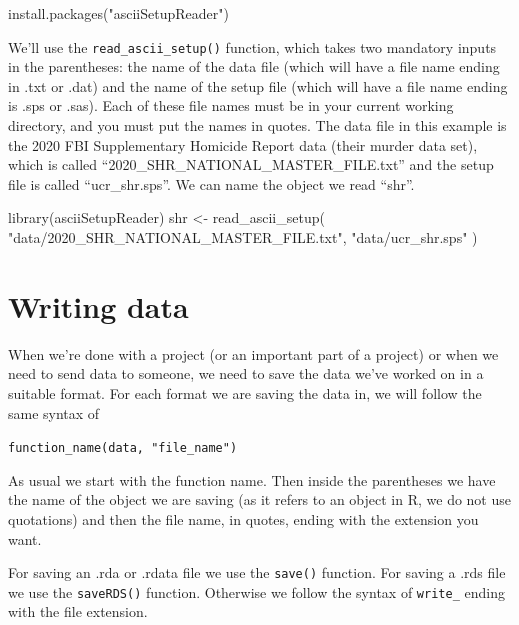 \documentclass[
]{krantz}
\makeatletter
\newenvironment{Shaded}{\begin{snugshade}}{\end{snugshade}}
\newcommand{\FunctionTok}[1]{\textcolor[rgb]{0,0,0}{#1}}
\newcommand{\NormalTok}[1]{#1}
\newcommand{\OtherTok}[1]{\textcolor[rgb]{0.37,0.37,0.37}{#1}}
\newcommand{\StringTok}[1]{\textcolor[rgb]{0.5,0.5,0.5}{#1}}
\newenvironment{kframe}{%
\medskip{}
\setlength{\fboxsep}{.8em}
 \def\at@end@of@kframe{}%
 \ifinner\ifhmode%
  \def\at@end@of@kframe{\end{minipage}}%
  \begin{minipage}{\columnwidth}%
 \fi\fi%
 \def\FrameCommand##1{\hskip\@totalleftmargin \hskip-\fboxsep
 \colorbox{shadecolor}{##1}\hskip-\fboxsep
     \hskip-\linewidth \hskip-\@totalleftmargin \hskip\columnwidth}%
 \MakeFramed {\advance\hsize-\width
   \@totalleftmargin\z@ \linewidth\hsize
   \@setminipage}}%
 {\par\unskip\endMakeFramed%
 \at@end@of@kframe}
\renewenvironment{Shaded}{\begin{kframe}}{\end{kframe}}
\makeatother
\begin{document}
\begin{Shaded}
\begin{Highlighting}[]
\FunctionTok{install.packages}\NormalTok{(}\StringTok{"asciiSetupReader"}\NormalTok{)}
\end{Highlighting}
\end{Shaded}

We'll use the \texttt{read\_ascii\_setup()} function, which
takes two mandatory inputs in the parentheses: the name of
the data file (which will have a file name ending in .txt or
.dat) and the name of the setup file (which will have a file
name ending is .sps or .sas). Each of these file names must
be in your current working directory, and you must put the
names in quotes. The data file in this example is the 2020
FBI Supplementary Homicide Report data (their murder data
set), which is called
``2020\_SHR\_NATIONAL\_MASTER\_FILE.txt'' and the setup file
is called ``ucr\_shr.sps''. We can name the object we read
``shr''.

\begin{Shaded}
\begin{Highlighting}[]
\FunctionTok{library}\NormalTok{(asciiSetupReader)}
\NormalTok{shr }\OtherTok{\textless{}{-}} \FunctionTok{read\_ascii\_setup}\NormalTok{(}
  \StringTok{"data/2020\_SHR\_NATIONAL\_MASTER\_FILE.txt"}\NormalTok{,}
  \StringTok{"data/ucr\_shr.sps"}
\NormalTok{)}
\end{Highlighting}
\end{Shaded}

\hypertarget{writing-data}{%
\section{Writing data}\label{writing-data}}

When we're done with a project (or an important part of a
project) or when we need to send data to someone, we need to
save the data we've worked on in a suitable format. For each
format we are saving the data in, we will follow the same
syntax of

\texttt{function\_name(data,\ "file\_name")}

As usual we start with the function name. Then inside the
parentheses we have the name of the object we are saving (as
it refers to an object in R, we do not use quotations) and
then the file name, in quotes, ending with the extension you
want.

For saving an .rda or .rdata file we use the \texttt{save()}
function. For saving a .rds file we use the
\texttt{saveRDS()} function. Otherwise we follow the syntax
of \texttt{write\_} ending with the file extension.
\end{document}
